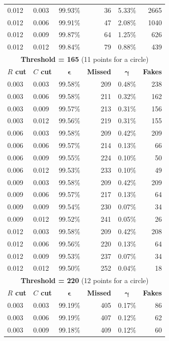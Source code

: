 \documentclass[11pt,twoside]{scrreprt}
\begin{document}
\begin{longtable}{llcrcr}
0.012 & 0.003 & 99.93\% & 36 & 5.33\% & 2665 \\
0.012 & 0.006 & 99.91\% & 47 & 2.08\% & 1040 \\
0.012 & 0.009 & 99.87\% & 64 & 1.25\% & 626 \\
0.012 & 0.012 & 99.84\% & 79 & 0.88\% & 439 \\
\bottomrule
\toprule
\multicolumn{6}{c}{\textbf{Threshold = 165} (11 points for a circle)}\\
\midrule
\textbf{$R$ cut} & \textbf{$C$ cut} & $\boldsymbol{\epsilon}$ & \textbf{Missed} & $\boldsymbol{\gamma}$ & \textbf{Fakes} \\
\midrule
0.003 & 0.003 & 99.58\% & 209 & 0.48\% & 238 \\
0.003 & 0.006 & 99.58\% & 211 & 0.32\% & 162 \\
0.003 & 0.009 & 99.57\% & 213 & 0.31\% & 156 \\
0.003 & 0.012 & 99.56\% & 219 & 0.31\% & 155 \\
0.006 & 0.003 & 99.58\% & 209 & 0.42\% & 209 \\
0.006 & 0.006 & 99.57\% & 214 & 0.13\% & 66 \\
0.006 & 0.009 & 99.55\% & 224 & 0.10\% & 50 \\
0.006 & 0.012 & 99.53\% & 233 & 0.10\% & 49 \\
0.009 & 0.003 & 99.58\% & 209 & 0.42\% & 209 \\
0.009 & 0.006 & 99.57\% & 217 & 0.13\% & 64 \\
0.009 & 0.009 & 99.54\% & 230 & 0.07\% & 34 \\
0.009 & 0.012 & 99.52\% & 241 & 0.05\% & 26 \\
0.012 & 0.003 & 99.58\% & 209 & 0.42\% & 208 \\
0.012 & 0.006 & 99.56\% & 220 & 0.13\% & 64 \\
0.012 & 0.009 & 99.53\% & 237 & 0.07\% & 34 \\
0.012 & 0.012 & 99.50\% & 252 & 0.04\% & 18 \\
\bottomrule
\toprule
\multicolumn{6}{c}{\textbf{Threshold = 220} (12 points for a circle)}\\
\midrule
\textbf{$R$ cut} & \textbf{$C$ cut} & $\boldsymbol{\epsilon}$ & \textbf{Missed} & $\boldsymbol{\gamma}$ & \textbf{Fakes} \\
\midrule
0.003 & 0.003 & 99.19\% & 405 & 0.17\% & 86 \\
0.003 & 0.006 & 99.19\% & 407 & 0.12\% & 62 \\
0.003 & 0.009 & 99.18\% & 409 & 0.12\% & 60 \\

\end{longtable}
\end{document}
